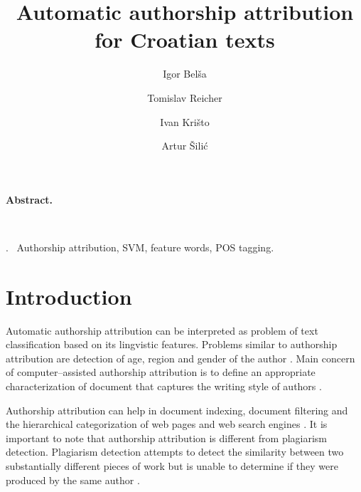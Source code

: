 \documentclass[11pt,english]{article}
\let\LaTeXtitle\title
\renewcommand{\title}[1]{\LaTeXtitle{\Large \textbf{#1}}}
\renewenvironment{abstract}
{\noindent \large \bf Abstract. \normalsize \begin{it}}
{\end{it}\\}
\newenvironment{keywords}
{\noindent {\large {\bf Keywords}}.~}{}
\begin{document}
\title{Automatic authorship attribution for Croatian texts}
\author{Igor Belša}
\author{Tomislav Reicher}
\author{Ivan Krišto}
\author{Artur Šilić}

\date{}

\maketitle

\thispagestyle{empty}
\pagestyle{empty}
\begin{multicols}{2}



\begin{abstract}
\end{abstract}

\begin{keywords}
Authorship attribution, SVM, feature words, POS tagging.
\end{keywords}

\section{Introduction}
Automatic authorship attribution can be interpreted as problem of text
classification based on its lingvistic features. Problems similar to authorship
attribution are detection of age, region and gender of the author
\citep{luyckx2005shallow}. Main concern of computer--assisted authorship
attribution is to define an appropriate characterization of document that
captures the writing style of authors \citep{coyotl2006authorship}.


Authorship attribution can help in document indexing, document filtering and the
hierarchical categorization of web pages and web search engines
\citep{luyckx2005shallow}. It is important to note that authorship attribution
is different from plagiarism detection. Plagiarism detection attempts to detect the
similarity between two substantially different pieces of work but is unable to
determine if they were produced by the same author \citep{de2001mining}.


\end{multicols}
\end{document}
